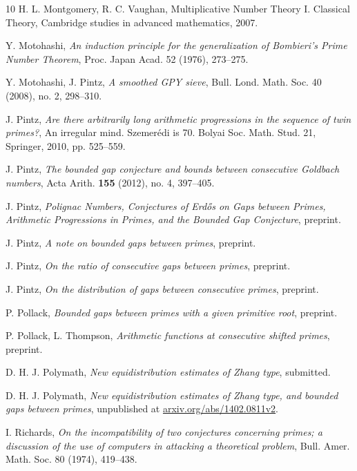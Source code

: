 \documentclass{bmcart}
\theoremstyle{plain}
\theoremstyle{definition}
\begin{document}
\begin{backmatter}
\begin{thebibliography}{10}
 H. L. Montgomery, R. C. Vaughan, Multiplicative
  Number Theory I. Classical Theory, Cambridge studies in advanced
  mathematics, 2007.

 Y. Motohashi, \emph{An induction principle for the
    generalization of Bombieri's Prime Number Theorem}, Proc. Japan
  Acad. 52 (1976), 273--275.

 Y. Motohashi, J. Pintz, \emph{A smoothed GPY sieve},
  Bull. Lond. Math. Soc. 40 (2008), no. 2, 298--310.

J. Pintz, \emph{Are there arbitrarily long arithmetic progressions in the sequence of twin primes?}, An irregular mind. Szemer\'edi is 70. Bolyai Soc. Math. Stud. 21, Springer, 2010, pp. 525–559.

J. Pintz, \emph{The bounded gap conjecture and bounds between consecutive Goldbach numbers}, Acta Arith. \textbf{155} (2012), no. 4, 397--405. 

 J. Pintz, \emph{Polignac Numbers, Conjectures
    of Erd\H{o}s on Gaps between Primes, Arithmetic Progressions in
    Primes, and the Bounded Gap Conjecture}, preprint.

 J. Pintz, \emph{A note on bounded gaps between
    primes}, preprint.

J. Pintz, \emph{On the ratio of consecutive gaps between primes}, preprint.

J. Pintz, \emph{On the distribution of gaps between consecutive primes}, preprint.

P. Pollack, \emph{Bounded gaps between primes with a given primitive root}, preprint.

P. Pollack, L. Thompson, \emph{Arithmetic functions at consecutive shifted primes}, preprint.

D. H. J. Polymath, \emph{New equidistribution estimates of Zhang type}, submitted.

D. H. J. Polymath, \emph{New equidistribution estimates of Zhang type, and bounded gaps between primes}, unpublished at \url{arxiv.org/abs/1402.0811v2}.

 I. Richards, \emph{On the incompatibility of two
    conjectures concerning primes; a discussion of the use of
    computers in attacking a theoretical problem},
  Bull. Amer. Math. Soc. 80 (1974), 419--438.


\end{thebibliography}
\end{backmatter}
\end{document}
